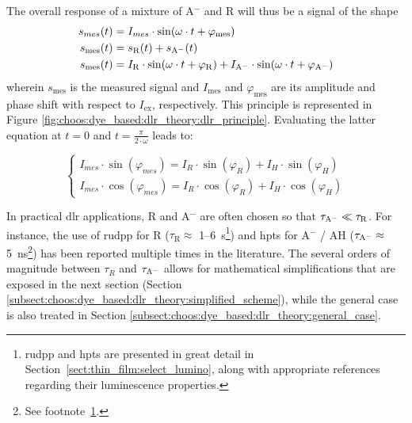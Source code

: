 The overall response of a mixture of A$^-$ and R will thus be a signal of the shape
\begin{equation}\label{eq:choos:dye_based:dlr_theory:s_mes_def}
	\begin{aligned}
		s_{mes}(t) &= I_{mes} \cdot \sin(\omega \cdot t + \varphi_\text{mes})\\
		s_\text{mes}(t) &= s_\mathrm{R}(t) + s_\mathrm{A^{\smash{-}}}(t)\\
		s_\text{mes}(t) &= I_\mathrm{R} \cdot \sin(\omega \cdot t + \varphi_\mathrm{R}) + I_\mathrm{A^{\smash{-}}} \cdot \sin(\omega \cdot t + \varphi_\mathrm{A^{\smash{-}}})
	\end{aligned}
\end{equation}
wherein $s_\text{mes}$ is the measured signal and $I_\text{mes}$ and $\varphi_\text{mes}$ are its amplitude and phase shift with respect to $I_\text{ex}$, respectively. This principle is represented in Figure \ref{fig:choos:dye_based:dlr_theory:dlr_principle}. Evaluating the latter equation at $t=0$ and $t=\frac{\pi}{2 \cdot \omega}$ leads to:

\begin{equation}\label{eq:choos:dye_based:dlr_theory:sincos_full}
	\begin{cases}
		I_{mes} \cdot \sin(\varphi_{mes}) = I_{R} \cdot \sin(\varphi_{R}) + I_{H} \cdot \sin(\varphi_{H})\\
		I_{mes} \cdot \cos(\varphi_{mes}) = I_{R} \cdot \cos(\varphi_{R}) + I_{H} \cdot \cos(\varphi_{H})
	\end{cases}
\end{equation}

In practical \gls{dlr} applications, R and A$^-$ are often chosen so that $\tau_\mathrm{A^{\smash{-}}} \ll \tau_\mathrm{R}$. For instance, the use of \gls{rudpp} for R ($\tau_\mathrm{R} \approx$ 1--6~\textmu{}s\footnote{\label{footnote:fluo_details}\gls{rudpp} and \gls{hpts} are presented in great detail in Section~\ref{sect:thin_film:select_lumino}, along with appropriate references regarding their luminescence properties.}) and \gls{hpts} for A$^-$ / AH ($\tau_\mathrm{A^{\smash{-}}} \approx$ 5~ns\footnote{See footnote~\ref*{footnote:fluo_details}.}) has been reported multiple times in the literature\cite{bultzingslowen2002, burke2006, cajlakovic2006}. The several orders of magnitude between $\tau_R$ and $\tau_\mathrm{A^{\smash{-}}}$ allows for mathematical simplifications that are exposed in the next section (Section \ref{subsect:choos:dye_based:dlr_theory:simplified_scheme}), while the general case is also treated in Section \ref{subsect:choos:dye_based:dlr_theory:general_case}.

